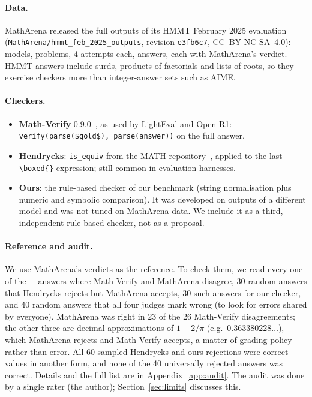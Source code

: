 \documentclass[11pt]{article}
\begin{document}
\paragraph{Data.}
MathArena released the full outputs of its HMMT February 2025 evaluation (\texttt{MathArena/hmmt\_feb\_2025\_outputs}, revision \texttt{e3fb6c7}, CC~BY-NC-SA~4.0): \maModels{} models, \maProblems{} problems, 4 attempts each, \maAnswers{} answers, each with MathArena's verdict. HMMT answers include surds, products of factorials and lists of roots, so they exercise checkers more than integer-answer sets such as AIME.

\paragraph{Checkers.}
\begin{itemize}
  \item \textbf{Math-Verify} 0.9.0~\citep{mathverify}, as used by LightEval and Open-R1: \texttt{verify(parse(\$gold\$), parse(answer))} on the full answer.
  \item \textbf{Hendrycks}: \texttt{is\_equiv} from the MATH repository~\citep{hendrycks2021math}, applied to the last \verb|\boxed{}| expression; still common in evaluation harnesses.
  \item \textbf{Ours}: the rule-based checker of our benchmark (string normalisation plus numeric and symbolic comparison). It was developed on outputs of a different model and was not tuned on MathArena data. We include it as a third, independent rule-based checker, not as a proposal.
\end{itemize}

\paragraph{Reference and audit.}
We use MathArena's verdicts as the reference. To check them, we read every one of the \the\numexpr\mathverifyFN+\mathverifyFP\relax{} answers where Math-Verify and MathArena disagree, 30 random answers that Hendrycks rejects but MathArena accepts, 30 such answers for our checker, and 40 random answers that all four judges mark wrong (to look for errors shared by everyone).
MathArena was right in 23 of the 26 Math-Verify disagreements; the other three are decimal approximations of $1-2/\pi$ (e.g.\ $0.363380228\ldots$), which MathArena rejects and Math-Verify accepts, a matter of grading policy rather than error.
All 60 sampled Hendrycks and ours rejections were correct values in another form, and none of the 40 universally rejected answers was correct.
Details and the full list are in Appendix~\ref{app:audit}.
The audit was done by a single rater (the author); Section~\ref{sec:limits} discusses this.
\end{document}
